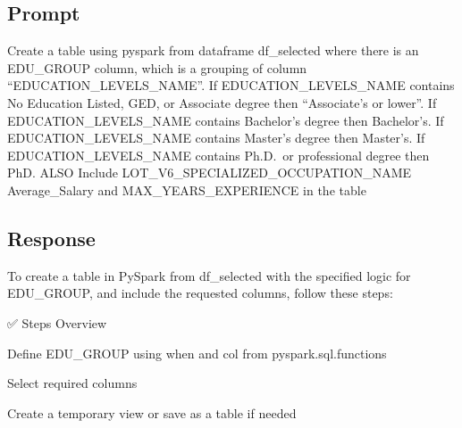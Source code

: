 \documentclass[
  letterpaper,
  DIV=11,
  numbers=noendperiod]{scrartcl}
\begin{document}
\subsection{Prompt}\label{prompt-4}

Create a table using pyspark from dataframe df\_selected where there is
an EDU\_GROUP column, which is a grouping of column
``EDUCATION\_LEVELS\_NAME''. If EDUCATION\_LEVELS\_NAME contains No
Education Listed, GED, or Associate degree then ``Associate's or
lower''. If EDUCATION\_LEVELS\_NAME contains Bachelor's degree then
Bachelor's. If EDUCATION\_LEVELS\_NAME contains Master's degree then
Master's. If EDUCATION\_LEVELS\_NAME contains Ph.D.~or professional
degree then PhD. ALSO Include LOT\_V6\_SPECIALIZED\_OCCUPATION\_NAME
Average\_Salary and MAX\_YEARS\_EXPERIENCE in the table

\subsection{Response}\label{response-4}

To create a table in PySpark from df\_selected with the specified logic
for EDU\_GROUP, and include the requested columns, follow these steps:

✅ Steps Overview

Define EDU\_GROUP using when and col from pyspark.sql.functions

Select required columns

Create a temporary view or save as a table if needed
\end{document}
